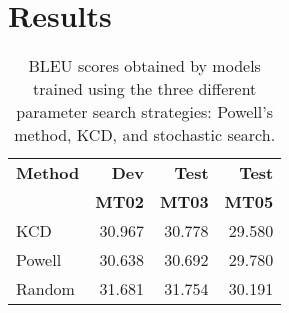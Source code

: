 \documentclass[11pt,tightenlines,kern-1pt]{article}
\begin{document}
  


\section{Results}

\begin{table}
\begin{center}
\begin{tabular}{|l|rrr|}
\hline \bf Method  & \bf Dev  & \bf Test & \bf Test \\ 
                   & \bf MT02 & \bf MT03 & \bf MT05 \\ \hline
KCD        & 30.967 & 30.778 & 29.580 \\
Powell     & 30.638 & 30.692 & 29.780  \\
Random     & 31.681 & 31.754 & 30.191 \\
\hline
\end{tabular}
\end{center}
\caption{
\label{searchstrat}
BLEU scores obtained by models trained using the three different parameter search strategies: Powell's method, KCD, and stochastic search.}
\end{table}



 
\end{document}
